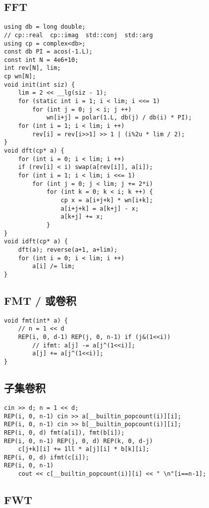 \documentclass[a4paper,landscape,twocolumn]{ctexart}
\begin{document}
\subsection{FFT}

\begin{lstlisting}
using db = long double;
// cp::real  cp::imag  std::conj  std::arg
using cp = complex<db>;
const db PI = acos(-1.L);
const int N = 4e6+10;
int rev[N], lim;
cp wn[N];
void init(int siz) {
	lim = 2 << __lg(siz - 1);
	for (static int i = 1; i < lim; i <<= 1)
		for (int j = 0; j < i; j ++)
			wn[i+j] = polar(1.L, db(j) / db(i) * PI);
	for (int i = 1; i < lim; i ++)
		rev[i] = rev[i>>1] >> 1 | (i%2u * lim / 2);
}
void dft(cp* a) {
	for (int i = 0; i < lim; i ++)
	if (rev[i] < i) swap(a[rev[i]], a[i]);
	for (int i = 1; i < lim; i <<= 1)
		for (int j = 0; j < lim; j += 2*i)
			for (int k = 0; k < i; k ++) {
				cp x = a[i+j+k] * wn[i+k];
				a[i+j+k] = a[k+j] - x;
				a[k+j] += x;
			}
}
void idft(cp* a) {
	dft(a); reverse(a+1, a+lim);
	for (int i = 0; i < lim; i ++)
		a[i] /= lim;
}
\end{lstlisting}

\subsection{FMT / 或卷积}

\begin{lstlisting}
void fmt(int* a) {
	// n = 1 << d
	REP(i, 0, d-1) REP(j, 0, n-1) if (j&(1<<i))
		// ifmt: a[j] -= a[j^(1<<i)];
		a[j] += a[j^(1<<i)];
}
\end{lstlisting}

\subsection{子集卷积}

\begin{lstlisting}
cin >> d; n = 1 << d;
REP(i, 0, n-1) cin >> a[__builtin_popcount(i)][i];
REP(i, 0, n-1) cin >> b[__builtin_popcount(i)][i];
REP(i, 0, d) fmt(a[i]), fmt(b[i]);
REP(i, 0, n-1) REP(j, 0, d) REP(k, 0, d-j)
	c[j+k][i] += 1ll * a[j][i] * b[k][i];
REP(i, 0, d) ifmt(c[i]);
REP(i, 0, n-1)
	cout << c[__builtin_popcount(i)][i] << " \n"[i==n-1];
\end{lstlisting}

\subsection{FWT}
\end{document}
